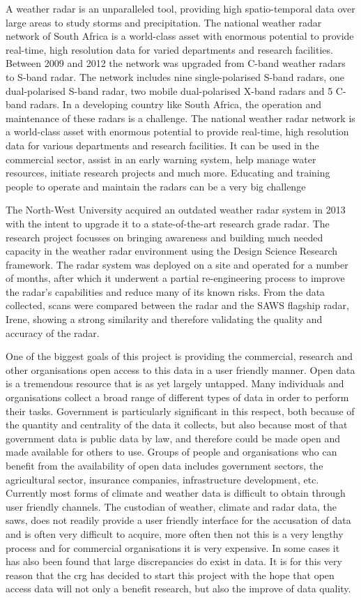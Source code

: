 \documentclass{wrcreport}
\begin{document}
A weather radar is an unparalleled tool, providing high
spatio-temporal data over large areas to study storms and
precipitation. The national weather radar network of South Africa is a
world-class asset with enormous potential to provide real-time, high
resolution data for varied departments and research facilities.
Between 2009 and 2012 the network was upgraded from C-band weather
radars to S-band radar. The network includes nine single-polarised
S-band radars, one dual-polarised S-band radar, two mobile
dual-polarised X-band radars and 5 C-band radars. In a developing
country like South Africa, the operation and maintenance of these
radars is a challenge. The national weather radar network is a
world-class asset with enormous potential to provide real-time, high
resolution data for various departments and research facilities. It
can be used in the commercial sector, assist in an early warning
system, help manage water resources, initiate research projects and
much more. Educating and training people to operate and maintain the
radars can be a very big challenge

The North-West University acquired an outdated weather radar system in
2013 with the intent to upgrade it to a state-of-the-art research
grade radar. The research project focusses on bringing awareness and
building much needed capacity in the weather radar environment using
the Design Science Research framework. The radar system was deployed
on a site and operated for a number of months, after which it
underwent a partial re-engineering process to improve the radar’s
capabilities and reduce many of its known risks. From the data
collected, scans were compared between the radar and the SAWS flagship
radar, Irene, showing a strong similarity and therefore validating the
quality and accuracy of the radar.

One of the biggest goals of this project is providing the commercial,
research and other organisations open access to this data in a user
friendly manner. Open data is a tremendous resource that is as yet
largely untapped. Many individuals and organisations collect a broad
range of different types of data in order to perform their tasks.
Government is particularly significant in this respect, both because
of the quantity and centrality of the data it collects, but also
because most of that government data is public data by law, and
therefore could be made open and made available for others to use.
Groups of people and organisations who can benefit from the
availability of open data includes government sectors, the
agricultural sector, insurance companies, infrastructure development,
etc. Currently most forms of climate and weather data is difficult to
obtain through user friendly channels. The custodian of weather,
climate and radar data, the \gls{saws}, does not readily provide a
user friendly interface for the accusation of data and is often very
difficult to acquire, more often then not this is a very lengthy
process and for commercial organisations it is very expensive. In some
cases it has also been found that large discrepancies do exist in
data. It is for this very reason that the \gls{crg} has decided to
start this project with the hope that open access data will not only a
benefit research, but also the improve of data quality.
\end{document}
